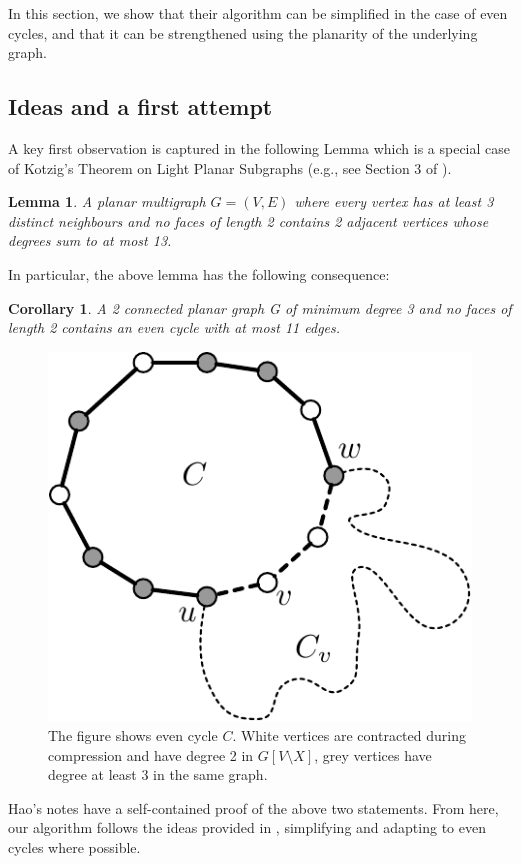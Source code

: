 \documentclass{article}
\newcommand{\0}{\mathbb{0}}
\newcommand{\1}{\mathbb{1}}
\newtheorem{lemma}[theorem]{Lemma}
\newtheorem{cor}[theorem]{Corollary}
\begin{document}
In this
section, we show that their algorithm can be simplified in the case of
even cycles, and that it can be strengthened using the planarity of
the underlying graph.

\subsection{Ideas and a first attempt}

A key first observation is captured in the following Lemma which is a
special case of Kotzig's Theorem on Light Planar Subgraphs (e.g., see
Section 3 of \cite{JV13}). 

\begin{lemma}
  A planar multigraph $ G=(V,E)$ where every vertex has at least 3
  distinct neighbours and no faces of length 2 contains 2 adjacent
  vertices whose degrees sum to at most 13.
\end{lemma}

In particular, the above lemma has the following consequence:

\begin{cor}\label{cor:smallec}
  A 2 connected planar graph G of minimum degree 3 and no faces of
  length 2 contains an even cycle with at most 11 edges.
\end{cor}

\begin{figure}
  \begin{center}
    \includegraphics[width=.3\textwidth]{simple-pd.pdf}
  \end{center}
  \caption{\label{fig:simplepd} The figure shows even cycle
    $C$. White vertices are contracted during compression and have
    degree 2 in $G[V\setminus X]$, grey vertices have degree at least
    3 in the same graph.}
\end{figure}

Hao's notes have a self-contained proof of the above two statements.
From here, our algorithm follows the ideas provided in \cite{FJP10},
simplifying and adapting to even cycles where possible. 
\end{document}

